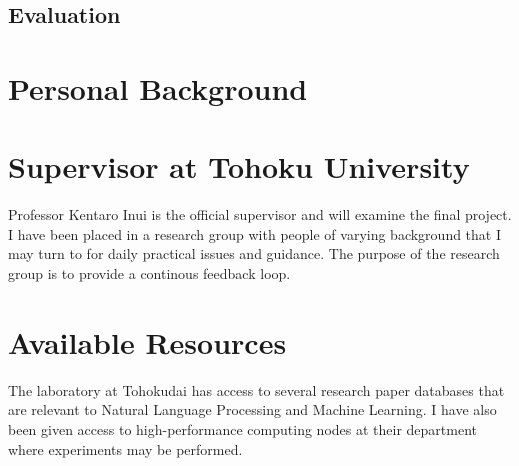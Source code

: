 \documentclass{article}
\begin{document}
\subsection{Evaluation}

\section{Personal Background}

\section{Supervisor at Tohoku University}
Professor Kentaro Inui is the official supervisor and will examine the final project. I have been placed in a research group with people of varying background that I may turn to for daily practical issues and guidance. The purpose of the research group is to provide a continous feedback loop.

\section{Available Resources}
The laboratory at Tohokudai has access to several research paper databases that are relevant to Natural Language Processing and Machine Learning. I have also been given access to high-performance computing nodes at their department where experiments may be performed.
\end{document}
